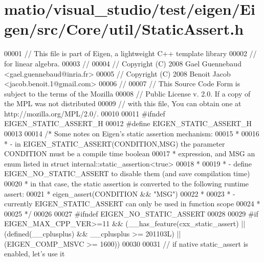 \hypertarget{matio_2visual__studio_2test_2eigen_2_eigen_2src_2_core_2util_2_static_assert_8h_source}{}\section{matio/visual\+\_\+studio/test/eigen/\+Eigen/src/\+Core/util/\+Static\+Assert.h}
\label{matio_2visual__studio_2test_2eigen_2_eigen_2src_2_core_2util_2_static_assert_8h_source}

\begin{DoxyCode}
00001 \textcolor{comment}{// This file is part of Eigen, a lightweight C++ template library}
00002 \textcolor{comment}{// for linear algebra.}
00003 \textcolor{comment}{//}
00004 \textcolor{comment}{// Copyright (C) 2008 Gael Guennebaud <gael.guennebaud@inria.fr>}
00005 \textcolor{comment}{// Copyright (C) 2008 Benoit Jacob <jacob.benoit.1@gmail.com>}
00006 \textcolor{comment}{//}
00007 \textcolor{comment}{// This Source Code Form is subject to the terms of the Mozilla}
00008 \textcolor{comment}{// Public License v. 2.0. If a copy of the MPL was not distributed}
00009 \textcolor{comment}{// with this file, You can obtain one at http://mozilla.org/MPL/2.0/.}
00010 
00011 \textcolor{preprocessor}{#ifndef EIGEN\_STATIC\_ASSERT\_H}
00012 \textcolor{preprocessor}{#define EIGEN\_STATIC\_ASSERT\_H}
00013 
00014 \textcolor{comment}{/* Some notes on Eigen's static assertion mechanism:}
00015 \textcolor{comment}{ *}
00016 \textcolor{comment}{ *  - in EIGEN\_STATIC\_ASSERT(CONDITION,MSG) the parameter CONDITION must be a compile time boolean}
00017 \textcolor{comment}{ *    expression, and MSG an enum listed in struct internal::static\_assertion<true>}
00018 \textcolor{comment}{ *}
00019 \textcolor{comment}{ *  - define EIGEN\_NO\_STATIC\_ASSERT to disable them (and save compilation time)}
00020 \textcolor{comment}{ *    in that case, the static assertion is converted to the following runtime assert:}
00021 \textcolor{comment}{ *      eigen\_assert(CONDITION && "MSG")}
00022 \textcolor{comment}{ *}
00023 \textcolor{comment}{ *  - currently EIGEN\_STATIC\_ASSERT can only be used in function scope}
00024 \textcolor{comment}{ *}
00025 \textcolor{comment}{ */}
00026 
00027 \textcolor{preprocessor}{#ifndef EIGEN\_NO\_STATIC\_ASSERT}
00028 
00029 \textcolor{preprocessor}{  #if EIGEN\_MAX\_CPP\_VER>=11 && (\_\_has\_feature(cxx\_static\_assert) || (defined(\_\_cplusplus) && \_\_cplusplus >=
       201103L) || (EIGEN\_COMP\_MSVC >= 1600))}
00030 
00031     \textcolor{comment}{// if native static\_assert is enabled, let's use it}

\end{DoxyCode}

